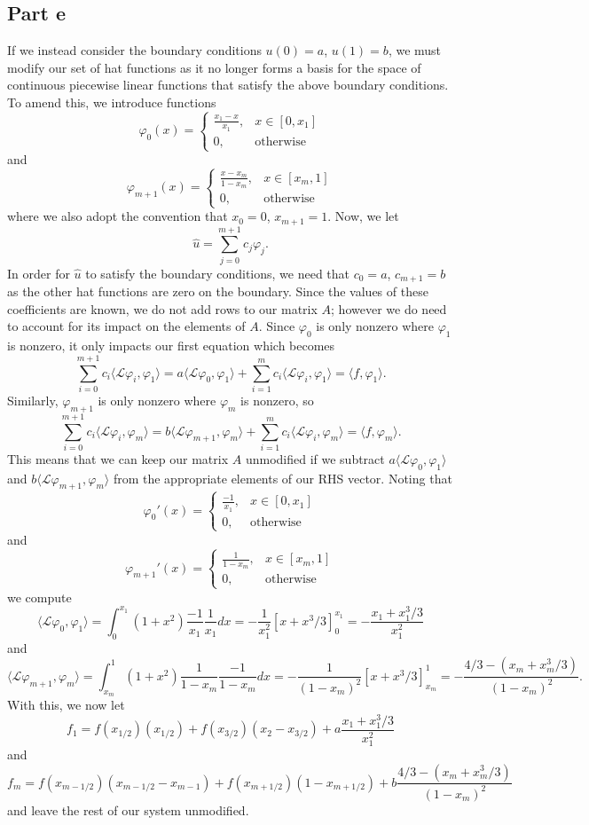 \documentclass{article}
\begin{document}
\subsection{Part e}
If we instead consider the boundary conditions $u(0) = a$, $u(1) = b$, we must modify our set of hat functions as it no longer forms a basis for the space of continuous piecewise linear functions that satisfy the above boundary conditions. To amend this, we introduce functions 
\[
\varphi_0(x)=\begin{cases}
\frac{x_1-x}{x_1}, &x\in[0,x_1]\\
0, &\text{otherwise}
\end{cases}
\]
and
\[
\varphi_{m+1}(x)=\begin{cases}
\frac{x-x_m}{1-x_m}, &x\in[x_m,1]\\
0, &\text{otherwise}
\end{cases}
\]
where we also adopt the convention that $x_0=0$, $x_{m+1}=1$. Now, we let 
\[
\hat{u}=\sum_{j=0}^{m+1}c_j\varphi_j.
\]
In order for $\hat{u}$ to satisfy the boundary conditions, we need that $c_0=a$, $c_{m+1}=b$ as the other hat functions are zero on the boundary. Since the values of these coefficients are known, we do not add rows to our matrix $A$; however we do need to account for its impact on the elements of $A$. Since $\varphi_0$ is only nonzero where $\varphi_1$ is nonzero, it only impacts our first equation which becomes
\[
\sum_{i=0}^{m+1} c_i\langle\mathcal{L}\varphi_i,\varphi_1\rangle=a\langle\mathcal{L}\varphi_0,\varphi_1\rangle+\sum_{i=1}^{m} c_i\langle\mathcal{L}\varphi_i,\varphi_1\rangle=\langle f,\varphi_1\rangle.
\]
Similarly, $\varphi_{m+1}$ is only nonzero where $\varphi_m$ is nonzero, so
\[
\sum_{i=0}^{m+1} c_i\langle\mathcal{L}\varphi_i,\varphi_m\rangle=b\langle\mathcal{L}\varphi_{m+1},\varphi_m\rangle+\sum_{i=1}^{m} c_i\langle\mathcal{L}\varphi_i,\varphi_m\rangle=\langle f,\varphi_m\rangle.
\]
This means that we can keep our matrix $A$ unmodified if we subtract $a\langle\mathcal{L}\varphi_0,\varphi_1\rangle$ and $b\langle\mathcal{L}\varphi_{m+1},\varphi_m\rangle$ from the appropriate elements of our RHS vector. Noting that 
\[
\varphi_0'(x)=\begin{cases}
\frac{-1}{x_1}, &x\in[0,x_1]\\
0, &\text{otherwise}
\end{cases}
\]
and
\[
\varphi_{m+1}'(x)=\begin{cases}
\frac{1}{1-x_m}, &x\in[x_m,1]\\
0, &\text{otherwise}
\end{cases}
\]
we compute
\[
\langle\mathcal{L}\varphi_0,\varphi_1\rangle=\int_0^{x_1}(1+x^2)\frac{-1}{x_1}\frac{1}{x_1}dx=-\frac{1}{x_1^2}\left[x+x^3/3\right]_0^{x_1}=-\frac{x_1+x_1^3/3}{x_1^2}
\]
and 
\[
\langle\mathcal{L}\varphi_{m+1},\varphi_m\rangle=\int_{x_m}^1(1+x^2)\frac{1}{1-x_m}\frac{-1}{1-x_m}dx=-\frac{1}{(1-x_m)^2}\left[x+x^3/3\right]_{x_m}^1=-\frac{4/3-(x_m+x_m^3/3)}{(1-x_m)^2}.
\]
With this, we now let
\[
f_1=f(x_{1/2})(x_{1/2})+f(x_{3/2})(x_{2}-x_{3/2})+a\frac{x_1+x_1^3/3}{x_1^2}
\]
and 
\[
f_m=f(x_{m-1/2})(x_{m-1/2}-x_{m-1})+f(x_{m+1/2})(1-x_{m+1/2})+b\frac{4/3-(x_m+x_m^3/3)}{(1-x_m)^2}
\]
and leave the rest of our system unmodified. 
\end{document}
